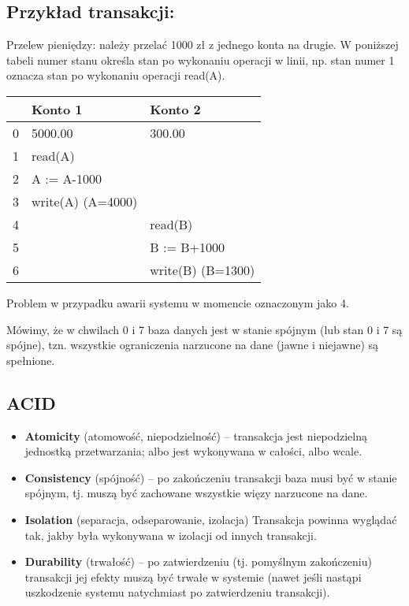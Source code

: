 \documentclass[main.tex]{subfiles}
\begin{document}
    \subsection{Przykład transakcji:}
    Przelew pieniędzy: należy przelać 1000 zł z jednego konta na drugie.
    W poniższej tabeli numer stanu określa stan po wykonaniu operacji w linii, np. stan numer 1
    oznacza stan po wykonaniu operacji read(A).

    \begin{table}[H]
        \begin{tabular}{|l|l|l|}
            \hline
            & Konto 1 & Konto 2           \\ \hline
            0 & 5000.00 & 300.00            \\ \hline
            1 & read(A)           &                   \\ \hline
            2 & A := A-1000 &                   \\ \hline
            3 & write(A) (A=4000) &                   \\ \hline
            4 & & read(B)           \\ \hline
            5 & & B := B+1000       \\ \hline
            6 & & write(B) (B=1300) \\ \hline
        \end{tabular}
    \end{table}

    Problem w przypadku awarii systemu w momencie oznaczonym jako 4.

    Mówimy, że w chwilach 0 i 7 baza danych jest w stanie spójnym (lub stan 0 i 7 są spójne), tzn.
    wszystkie ograniczenia narzucone na dane (jawne i niejawne) są spełnione.

    \subsection{ACID}
    \begin{itemize}
        \item \textbf{Atomicity} (atomowość, niepodzielność) – transakcja jest niepodzielną jednostką
        przetwarzania; albo jest wykonywana w całości, albo wcale.
        \item \textbf{Consistency} (spójność) – po zakończeniu transakcji baza musi być w stanie spójnym, tj. muszą
        być zachowane wszystkie więzy narzucone na dane.
        \item \textbf{Isolation} (separacja, odseparowanie, izolacja) Transakcja powinna wyglądać tak, jakby była
        wykonywana w izolacji od innych transakcji.
        \item \textbf{Durability} (trwałość) – po zatwierdzeniu (tj. pomyślnym zakończeniu) transakcji jej efekty
        muszą być trwałe w systemie (nawet jeśli nastąpi uszkodzenie systemu natychmiast po
        zatwierdzeniu transakcji).
    \end{itemize}
\end{document}
